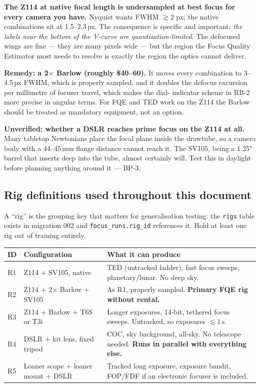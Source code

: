 \documentclass[11pt]{article}
\newcommand{\co}[1]{\texttt{\small #1}}
\begin{document}
\begin{redbox}
\textbf{The Z114 at native focal length is undersampled at best focus for every
camera you have.} Nyquist wants FWHM $\gtrsim 2$ px; the native combinations sit
at 1.5--2.3\,px. The consequence is specific and important: \emph{the labels
near the bottom of the V-curve are quantisation-limited}. The defocused wings
are fine --- they are many pixels wide --- but the region the Focus Quality
Estimator most needs to resolve is exactly the region the optics cannot deliver.

\textbf{Remedy: a 2$\times$ Barlow (roughly \$40--60).} It moves every
combination to 3--4.5\,px FWHM, which is properly sampled, and it doubles the
defocus excursion per millimetre of focuser travel, which makes the dial-
indicator scheme in RB-2 more precise in angular terms. For FQE and TED work on
the Z114 the Barlow should be treated as mandatory equipment, not an option.
\end{redbox}

\begin{warnbox}
\textbf{Unverified: whether a DSLR reaches prime focus on the Z114 at all.}
Many tabletop Newtonians place the focal plane inside the drawtube, so a
camera body with a 44--45\,mm flange distance cannot reach it. The SV105, being
a 1.25" barrel that inserts deep into the tube, almost certainly will. Test this
in daylight before planning anything around it --- BP-3.
\end{warnbox}

\subsection{Rig definitions used throughout this document}\label{sec:rigs}

A ``rig'' is the grouping key that matters for generalisation testing: the
\co{rigs} table exists in migration 002 and \co{focus\_runs.rig\_id} references
it. Hold at least one rig out of training entirely.

\begin{center}
\small
\begin{tabular}{@{}llp{}@{}}
\toprule
\textbf{ID} & \textbf{Configuration} & \textbf{What it can produce} \\
\midrule
R1 & Z114 + SV105, native & TED (untracked ladder), fast focus sweeps, planetary/lunar. No deep sky. \\
R2 & Z114 + 2$\times$ Barlow + SV105 & As R1, properly sampled. \textbf{Primary FQE rig without rental.} \\
R3 & Z114 + Barlow + T6S or T3i & Longer exposures, 14-bit, tethered focus sweeps. Untracked, so exposures $\lesssim 1$\,s. \\
R4 & DSLR + kit lens, fixed tripod & COC, sky background, all-sky. No telescope needed. \textbf{Runs in parallel with everything else.} \\
R5 & Loaner scope + loaner mount + DSLR & Tracked long exposure, exposure bandit, FOP/FDF if an electronic focuser is included. \\
\bottomrule
\end{tabular}
\end{center}
\end{document}
